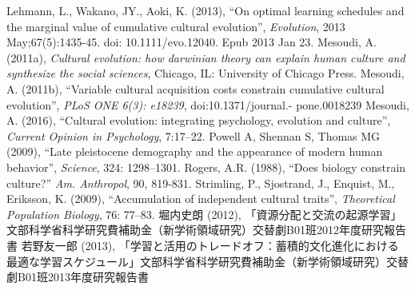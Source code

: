 \documentclass[a4paper, dvipdfmx]{article}
\begin{document}
\begin{flushleft}
\begin{thebibliography}{1}
 Lehmann, L., Wakano, JY., Aoki, K. (2013), ``On optimal learning schedules and the marginal value of cumulative cultural evolution'', {\it Evolution}, 2013 May;67(5):1435-45. doi: 10.1111/evo.12040. Epub 2013 Jan 23.
 Mesoudi, A. (2011a), {\it Cultural evolution: how darwinian theory can explain human culture and synthesize the social sciences}, Chicago, IL: University of Chicago Press.
 Mesoudi, A. (2011b), ``Variable cultural acquisition costs constrain cumulative cultural evolution'', {\it PLoS ONE 6(3): e18239}, doi:10.1371/journal.- pone.0018239
 Mesoudi, A. (2016), ``Cultural evolution: integrating psychology, evolution and culture'', {\it Current Opinion in Psychology}, 7:17–22.
 Powell A, Shennan S, Thomas MG (2009), ``Late pleistocene demography and the appearance of modern human behavior'', {\it Science}, 324: 1298–1301.
 Rogers, A.R. (1988), ``Does biology constrain culture?'' {\it Am. Anthropol}, 90, 819-831.
 Strimling, P., Sjostrand, J., Enquist, M., Eriksson, K. (2009), ``Accumulation of independent cultural traits'', {\it Theoretical Population Biology}, 76: 77–83.
 堀内史朗 (2012), 「資源分配と交流の起源学習」文部科学省科学研究費補助金（新学術領域研究）交替劇B01班2012年度研究報告書
 若野友一郎 (2013), 「学習と活用のトレードオフ：蓄積的文化進化における最適な学習スケジュール」文部科学省科学研究費補助金（新学術領域研究）交替劇B01班2013年度研究報告書
\end{thebibliography}
\end{flushleft}
\end{document}
